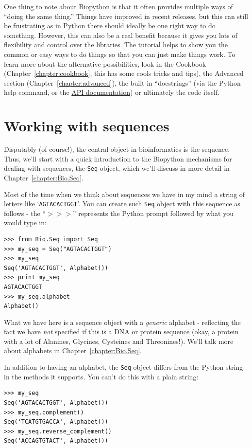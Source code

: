 \documentclass{report}
\begin{document}
One thing to note about Biopython is that it often provides multiple ways of ``doing the same thing.'' Things have improved in recent releases, but this can still be frustrating as in Python there should ideally be one right way to do something. However, this can also be a real benefit because it gives you lots of flexibility and control over the libraries. The tutorial helps to show you the common or easy ways to do things so that you can just make things work. To learn more about the alternative possibilities, look in the Cookbook (Chapter~\ref{chapter:cookbook}, this has some cools tricks and tips), the Advanced section (Chapter~\ref{chapter:advanced}), the built in ``docstrings'' (via the Python help command, or the \href{http://biopython.org/DIST/docs/api/}{API documentation}) or ultimately the code itself.

\section{Working with sequences}
\label{sec:sequences}

Disputably (of course!), the central object in bioinformatics is the sequence. Thus, we'll start with a quick introduction to the Biopython mechanisms for dealing with sequences, the \verb|Seq| object, which we'll discuss in more detail in Chapter~\ref{chapter:Bio.Seq}.

Most of the time when we think about sequences we have in my mind a string of letters like `\verb|AGTACACTGGT|'. You can create such \verb|Seq| object with this sequence as follows - the ``$>>>$'' represents the Python prompt followed by what you would type in:

\begin{verbatim}
>>> from Bio.Seq import Seq
>>> my_seq = Seq("AGTACACTGGT")
>>> my_seq
Seq('AGTACACTGGT', Alphabet())
>>> print my_seq
AGTACACTGGT
>>> my_seq.alphabet
Alphabet()
\end{verbatim}

What we have here is a sequence object with a \emph{generic} alphabet - reflecting the fact we have \emph{not} specified if this is a DNA or protein sequence (okay, a protein with a lot of Alanines, Glycines, Cysteines and Threonines!).  We'll talk more about alphabets in Chapter~\ref{chapter:Bio.Seq}.

In addition to having an alphabet, the \verb|Seq| object differs from the Python string in the methods it supports.  You can't do this with a plain string:

\begin{verbatim}
>>> my_seq
Seq('AGTACACTGGT', Alphabet())
>>> my_seq.complement()
Seq('TCATGTGACCA', Alphabet())
>>> my_seq.reverse_complement()
Seq('ACCAGTGTACT', Alphabet())
\end{verbatim}
\end{document}

